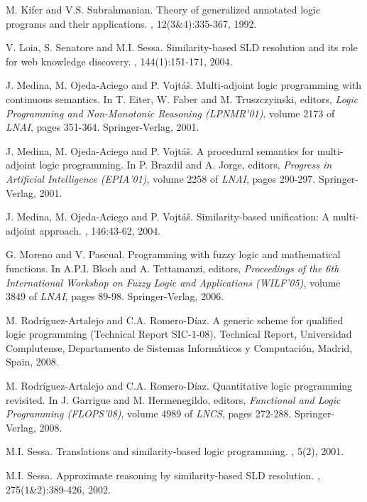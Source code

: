 \documentclass{sigplanconf}
\theoremstyle{definition}
\theoremstyle{plain}
\begin{document}
\begin{thebibliography}{22}
M. Kifer and V.S. Subrahmanian.
\newblock Theory of generalized annotated logic programs and their applications.
, 12(3\&4):335-367, 1992.

V. Loia, S. Senatore and M.I. Sessa.
\newblock Similarity-based SLD resolution and its role for web knowledge discovery.
, 144(1):151-171, 2004.

J. Medina, M. Ojeda-Aciego and P. Vojt\'a\v{s}.
\newblock Multi-adjoint logic programming with continuous semantics.
\newblock In T. Eiter, W. Faber and M. Truszczyinski, editors, {\em Logic Programming and Non-Monotonic Reasoning (LPNMR'01)}, volume 2173 of {\em LNAI}, pages 351-364. Springer-Verlag, 2001.

J. Medina, M. Ojeda-Aciego and P. Vojt\'a\v{s}.
\newblock A procedural semantics for multi-adjoint logic programming.
\newblock In P. Brazdil and A. Jorge, editors, {\em Progress in Artificial Intelligence (EPIA'01)}, volume 2258 of {\em LNAI}, pages 290-297. Springer-Verlag, 2001.

J. Medina, M. Ojeda-Aciego and P. Vojt\'a\v{s}.
\newblock Similarity-based unification: A multi-adjoint approach.
, 146:43-62, 2004.

G. Moreno and V. Pascual.
\newblock Programming with fuzzy logic and mathematical functions. In A.P.I. Bloch and A. Tettamanzi, editors, {\em Proceedings of the 6th International Workshop on Fuzzy Logic and Applications (WILF'05)}, volume 3849 of {\em LNAI}, pages 89-98. Springer-Verlag, 2006.

M. Rodr\'iguez-Artalejo and C.A. Romero-D\'iaz.
\newblock A generic scheme for qualified logic programming (Technical Report SIC-1-08).
\newblock Technical Report, Universidad Complutense, Departamento de Sistemas Inform\'aticos y Computaci\'on, Madrid, Spain, 2008.

M. Rodr\'iguez-Artalejo and C.A. Romero-D\'iaz.
\newblock Quantitative logic programming revisited.
\newblock In J. Garrigue and M. Hermenegildo, editors, {\em Functional and Logic Programming (FLOPS'08)}, volume 4989 of {\em LNCS}, pages 272-288. Springer-Verlag, 2008.

M.I. Sessa.
\newblock Translations and similarity-based logic programming.
, 5(2), 2001.

M.I. Sessa.
\newblock Approximate reasoning by similarity-based SLD resolution.
, 275(1\&2):389-426, 2002.


\end{thebibliography}
\end{document}
